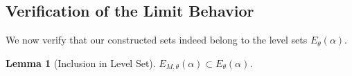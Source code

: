 \documentclass{article}
\newtheorem{lemma}[theorem]{Lemma}
\newtheorem{remark}[theorem]{Remark}
\numberwithin{equation}{section}
\begin{document}

\subsection{Verification of the Limit Behavior}

We now verify that our constructed sets indeed belong to the level sets $E_\theta(\alpha)$.

\begin{lemma}[Inclusion in Level Set] \label{lem:inclusion}
$E_{M,\theta}(\alpha) \subset E_\theta(\alpha)$.
\end{lemma}
\end{document}
